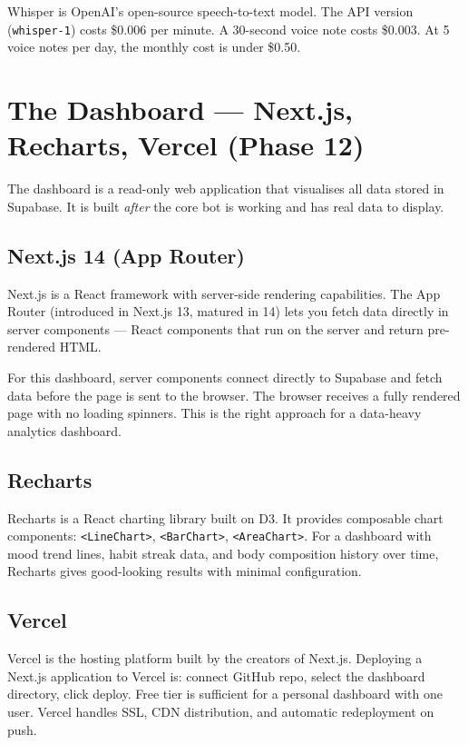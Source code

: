 \documentclass[12pt, a4paper]{article}
\begin{document}
Whisper is OpenAI's open-source speech-to-text model. The API version (\texttt{whisper-1}) costs \$0.006 per minute. A 30-second voice note costs \$0.003. At 5 voice notes per day, the monthly cost is under \$0.50.

\section{The Dashboard --- Next.js, Recharts, Vercel (Phase 12)}

The dashboard is a read-only web application that visualises all data stored in Supabase. It is built \textit{after} the core bot is working and has real data to display.

\subsection{Next.js 14 (App Router)}

Next.js is a React framework with server-side rendering capabilities. The App Router (introduced in Next.js 13, matured in 14) lets you fetch data directly in server components --- React components that run on the server and return pre-rendered HTML.

For this dashboard, server components connect directly to Supabase and fetch data before the page is sent to the browser. The browser receives a fully rendered page with no loading spinners. This is the right approach for a data-heavy analytics dashboard.

\subsection{Recharts}

Recharts is a React charting library built on D3. It provides composable chart components: \texttt{<LineChart>}, \texttt{<BarChart>}, \texttt{<AreaChart>}. For a dashboard with mood trend lines, habit streak data, and body composition history over time, Recharts gives good-looking results with minimal configuration.

\subsection{Vercel}

Vercel is the hosting platform built by the creators of Next.js. Deploying a Next.js application to Vercel is: connect GitHub repo, select the dashboard directory, click deploy. Free tier is sufficient for a personal dashboard with one user. Vercel handles SSL, CDN distribution, and automatic redeployment on push.
\end{document}
